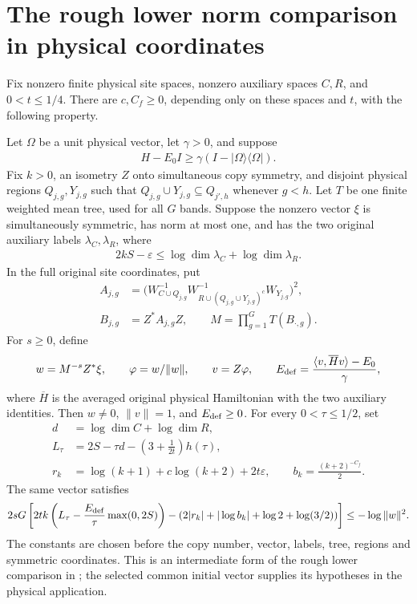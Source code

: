 \section{The rough lower norm comparison in physical coordinates}

\begin{theorem}
  \label{thm:regional_rough_lower_norm}
  \leanok
  Fix nonzero finite physical site spaces, nonzero auxiliary spaces $C,R$,
  and $0<t\leq1/4$. There are $c,C_f\geq0$, depending only on these
  spaces and $t$, with the following property.

  Let $\Omega$ be a unit physical vector, let $\gamma>0$, and suppose
  \begin{align*}
    H-E_0I\geq\gamma(I-|\Omega\rangle\langle\Omega|).
  \end{align*}
  Fix $k>0$, an isometry $Z$ onto simultaneous copy symmetry, and
  disjoint physical regions $Q_{j,g},Y_{j,g}$ such that
  $Q_{j,g}\cup Y_{j,g}\subseteq Q_{j',h}$ whenever $g<h$.
  Let $T$ be one finite weighted mean tree, used for all $G$ bands.
  Suppose the nonzero vector $\xi$ is simultaneously symmetric,
  has norm at most one, and has the two original auxiliary labels
  $\lambda_C,\lambda_R$, where
  \begin{align*}
    2kS-\varepsilon\leq\log\dim\lambda_C+\log\dim\lambda_R.
  \end{align*}
  In the full original site coordinates, put
  \begin{align*}
    A_{j,g}
      &=\bigl(W_{C\cup Q_{j,g}}^{-1}
          W_{R\cup(Q_{j,g}\cup Y_{j,g})^c}^{-1}W_{Y_{j,g}}\bigr)^2,\\
    B_{j,g}&=Z^*A_{j,g}Z,\qquad
    M=\prod_{g=1}^{G}T(B_{\cdot,g}).
  \end{align*}
  For $s\geq0$, define
  \begin{align*}
    w=M^{-s}Z^*\xi,\qquad \varphi=w/\|w\|,\qquad v=Z\varphi,\qquad
    E_{\rm def}=\frac{\langle v,\overline H v\rangle-E_0}{\gamma},
  \end{align*}
  where $\overline H$ is the averaged original physical Hamiltonian
  with the two auxiliary identities.
  Then $w\ne0$, $\|v\|=1$, and $E_{\rm def}\geq0$.
  For every $0<\tau\leq1/2$, set
  \begin{align*}
    d&=\log\dim C+\log\dim R,\\
    L_\tau&=2S-\tau d-\left(3+\frac1{2t}\right)h(\tau),\\
    r_k&=\log(k+1)+c\log(k+2)+2t\varepsilon,\qquad
    b_k=\frac{(k+2)^{-C_f}}2.
  \end{align*}
  The same vector satisfies
  \begin{align*}
    2sG\left[
      2tk\left(L_\tau-\frac{E_{\rm def}}\tau\max(0,2S)\right)
      -\left(2|r_k|+|\log b_k|+\log2+\log(3/2)\right)
    \right]
    \leq-\log\|w\|^2.
  \end{align*}
  The constants are chosen before the copy number, vector, labels,
  tree, regions and symmetric coordinates. This is an intermediate
  form of the rough lower comparison in
  \cite[Section~8]{OpenAI2026AreaLaw}; the selected common initial vector
  supplies its hypotheses in the physical application.
\end{theorem}
